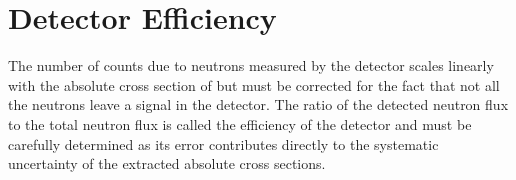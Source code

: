 
\section{Detector Efficiency}

\label{sec:efficiency}
The number of counts due to neutrons measured by the detector scales linearly with the absolute cross section of \reaction but must be corrected for the fact that not all the neutrons leave a signal in the detector.  The ratio of the detected neutron flux to the total neutron flux is called the efficiency of the detector and must be carefully determined as its error contributes directly to the systematic uncertainty of the extracted absolute cross sections.

